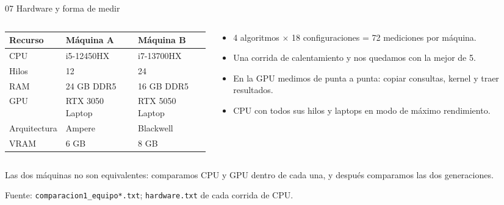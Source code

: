 \documentclass[aspectratio=169,10pt]{beamer}
\newcommand{\x}{$\times$}
\newcommand{\fuente}[1]{\vfill{\scriptsize\color{gray}Fuente: #1}}
\newcommand{\nota}[1]{\begin{center}\colorbox{azul!10}{\parbox{0.94\textwidth}{\centering\small #1}}\end{center}}
\begin{document}
\begin{frame}{07 \quad Hardware y forma de medir}
  \begin{columns}[T]
    \begin{column}{0.52\textwidth}
      \centering
      \small\setlength{\tabcolsep}{4pt}
      \begin{tabular}{lll}
        \toprule
        Recurso & Máquina A & Máquina B \\
        \midrule
        CPU      & i5-12450HX      & i7-13700HX \\
        Hilos    & 12              & 24 \\
        RAM      & 24 GB DDR5      & 16 GB DDR5 \\
        GPU      & RTX 3050 Laptop & RTX 5050 Laptop \\
        Arquitectura & Ampere      & Blackwell \\
        VRAM     & 6 GB            & 8 GB \\
        \bottomrule
      \end{tabular}
    \end{column}
    \begin{column}{0.45\textwidth}
      \begin{itemize}
        \item 4 algoritmos \x{} 18 configuraciones = 72 mediciones por máquina.
        \item Una corrida de calentamiento y nos quedamos con la mejor de 5.
        \item En la GPU medimos de punta a punta: copiar consultas, kernel y traer
              resultados.
        \item CPU con todos sus hilos y laptops en modo de máximo rendimiento.
      \end{itemize}
    \end{column}
  \end{columns}
  \vspace{6pt}
  \nota{Las dos máquinas no son equivalentes: comparamos CPU y GPU dentro de cada una, y
  después comparamos las dos generaciones.}
  \fuente{\texttt{comparacion1\_equipo*.txt}; \texttt{hardware.txt} de cada corrida de CPU.}
\end{frame}
\end{document}
